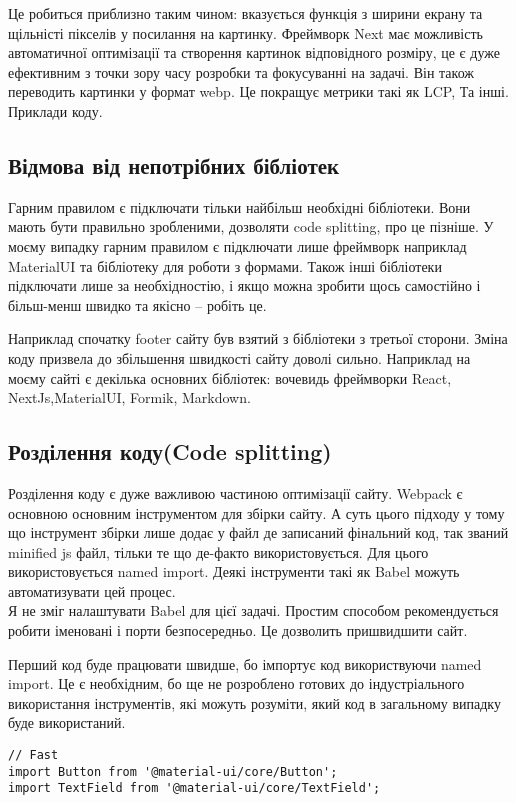 Це робиться приблизно таким чином: вказується функція з ширини екрану та щільністі пікселів у посилання на картинку.
Фреймворк Next має можливість автоматичної оптимізації та створення картинок відповідного розміру, це є дуже ефективним з точки зору часу розробки та фокусуванні на задачі.
Він також переводить картинки у формат webp.
Це покращує метрики такі як LCP, Та інші.
Приклади коду.

\subsection{Відмова від непотрібних бібліотек}
Гарним правилом є підключати тільки найбільш необхідні бібліотеки.
Вони мають бути правильно зробленими, дозволяти code splitting, про це пізніше.
У моєму випадку гарним правилом є підключати лише фреймворк наприклад MaterialUI та бібліотеку для роботи з формами.
Також інші бібліотеки підключати лише за необхідностію, і якщо можна зробити щось самостійно і більш-менш швидко
та якісно -- робіть це.

Наприклад спочатку footer сайту був взятий з бібліотеки з третьої сторони.
Зміна коду призвела до збільшення швидкості сайту доволі сильно.
Наприклад на моєму сайті є декілька основних бібліотек: вочевидь фреймворки React, NextJs,MaterialUI, Formik, Markdown.

\subsection{Розділення коду(Code splitting)}
Розділення коду є дуже важливою частиною оптимізації сайту.
Webpack є основною основним інструментом для збірки сайту.
А суть цього підходу у тому що інструмент збірки лише додає у файл де записаний фінальний код, так званий minified js файл,
тільки те що де-факто використовується.
Для цього використовується named import.
Деякі інструменти такі як Babel можуть автоматизувати цей процес. \\

Я не зміг налаштувати Babel для цієї задачі.
Простим способом рекомендується робити іменовані і порти безпосередньо.
Це дозволить пришвидшити сайт.

Перший код буде працювати швидше, бо імпортує код використвуючи named import.
Це є необхідним, бо ще не розроблено готових до індустріального використання інструментів, які можуть розуміти,
який код в загальному випадку буде використаний.
\begin{lstlisting}
// Fast
import Button from '@material-ui/core/Button';
import TextField from '@material-ui/core/TextField';
\end{lstlisting}

